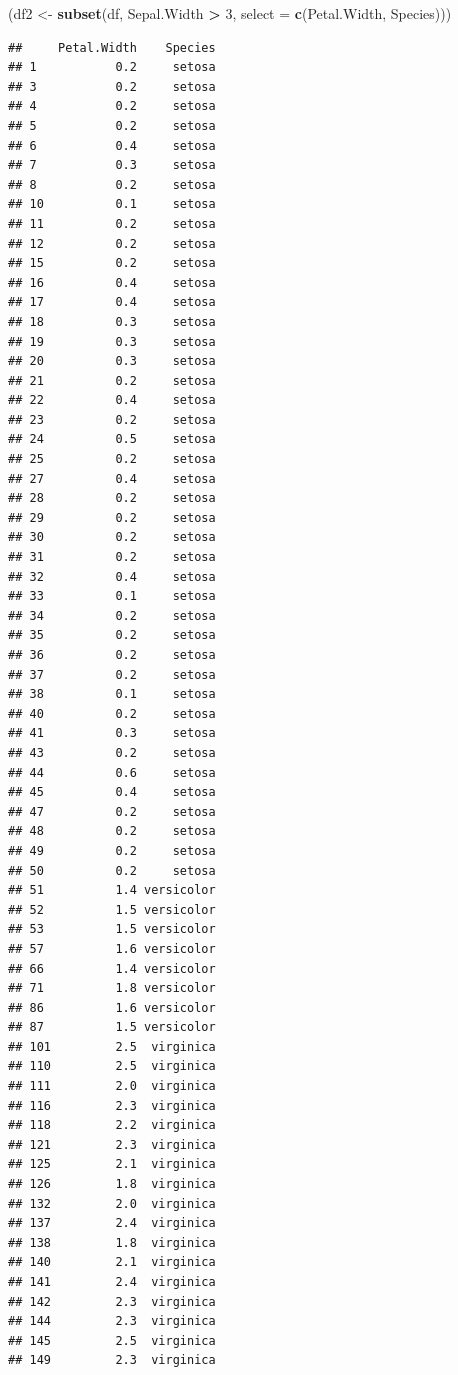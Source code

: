 \documentclass[
]{book}
\newenvironment{Shaded}{\begin{snugshade}}{\end{snugshade}}
\newcommand{\AttributeTok}[1]{\textcolor[rgb]{0.13,0.29,0.53}{#1}}
\newcommand{\DecValTok}[1]{\textcolor[rgb]{0.00,0.00,0.81}{#1}}
\newcommand{\FunctionTok}[1]{\textcolor[rgb]{0.13,0.29,0.53}{\textbf{#1}}}
\newcommand{\NormalTok}[1]{#1}
\newcommand{\OtherTok}[1]{\textcolor[rgb]{0.56,0.35,0.01}{#1}}
\newcommand{\SpecialCharTok}[1]{\textcolor[rgb]{0.81,0.36,0.00}{\textbf{#1}}}
\theoremstyle{definition}
\theoremstyle{definition}
\theoremstyle{definition}
\theoremstyle{definition}
\theoremstyle{remark}
\begin{document}
\begin{Shaded}
\begin{Highlighting}[]
\NormalTok{(df2 }\OtherTok{\textless{}{-}} \FunctionTok{subset}\NormalTok{(df, Sepal.Width }\SpecialCharTok{\textgreater{}} \DecValTok{3}\NormalTok{, }\AttributeTok{select =} \FunctionTok{c}\NormalTok{(Petal.Width, Species)))}
\end{Highlighting}
\end{Shaded}

\begin{verbatim}
##     Petal.Width    Species
## 1           0.2     setosa
## 3           0.2     setosa
## 4           0.2     setosa
## 5           0.2     setosa
## 6           0.4     setosa
## 7           0.3     setosa
## 8           0.2     setosa
## 10          0.1     setosa
## 11          0.2     setosa
## 12          0.2     setosa
## 15          0.2     setosa
## 16          0.4     setosa
## 17          0.4     setosa
## 18          0.3     setosa
## 19          0.3     setosa
## 20          0.3     setosa
## 21          0.2     setosa
## 22          0.4     setosa
## 23          0.2     setosa
## 24          0.5     setosa
## 25          0.2     setosa
## 27          0.4     setosa
## 28          0.2     setosa
## 29          0.2     setosa
## 30          0.2     setosa
## 31          0.2     setosa
## 32          0.4     setosa
## 33          0.1     setosa
## 34          0.2     setosa
## 35          0.2     setosa
## 36          0.2     setosa
## 37          0.2     setosa
## 38          0.1     setosa
## 40          0.2     setosa
## 41          0.3     setosa
## 43          0.2     setosa
## 44          0.6     setosa
## 45          0.4     setosa
## 47          0.2     setosa
## 48          0.2     setosa
## 49          0.2     setosa
## 50          0.2     setosa
## 51          1.4 versicolor
## 52          1.5 versicolor
## 53          1.5 versicolor
## 57          1.6 versicolor
## 66          1.4 versicolor
## 71          1.8 versicolor
## 86          1.6 versicolor
## 87          1.5 versicolor
## 101         2.5  virginica
## 110         2.5  virginica
## 111         2.0  virginica
## 116         2.3  virginica
## 118         2.2  virginica
## 121         2.3  virginica
## 125         2.1  virginica
## 126         1.8  virginica
## 132         2.0  virginica
## 137         2.4  virginica
## 138         1.8  virginica
## 140         2.1  virginica
## 141         2.4  virginica
## 142         2.3  virginica
## 144         2.3  virginica
## 145         2.5  virginica
## 149         2.3  virginica
\end{verbatim}
\end{document}

